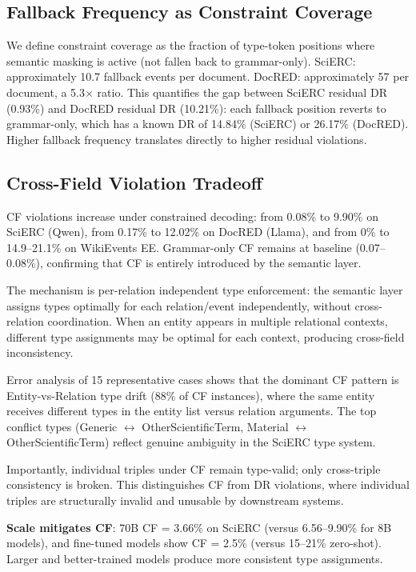 \documentclass[11pt,a4paper]{article}
\newcommand{\drsym}{\textsc{DR}}
\newcommand{\cfsym}{\textsc{CF}}
\begin{document}
\subsection{Fallback Frequency as Constraint Coverage}

We define constraint coverage as the fraction of type-token positions where semantic masking is active (not fallen back to grammar-only). SciERC: approximately 10.7 fallback events per document. DocRED: approximately 57 per document, a 5.3$\times$ ratio. This quantifies the gap between SciERC residual \drsym{} (0.93\%) and DocRED residual \drsym{} (10.21\%): each fallback position reverts to grammar-only, which has a known \drsym{} of 14.84\% (SciERC) or 26.17\% (DocRED). Higher fallback frequency translates directly to higher residual violations.

\subsection{Cross-Field Violation Tradeoff}
\label{sec:cf}

\cfsym{} violations increase under constrained decoding: from 0.08\% to 9.90\% on SciERC (Qwen), from 0.17\% to 12.02\% on DocRED (Llama), and from 0\% to 14.9--21.1\% on WikiEvents EE. Grammar-only \cfsym{} remains at baseline (0.07--0.08\%), confirming that \cfsym{} is entirely introduced by the semantic layer.

The mechanism is per-relation independent type enforcement: the semantic layer assigns types optimally for each relation/event independently, without cross-relation coordination. When an entity appears in multiple relational contexts, different type assignments may be optimal for each context, producing cross-field inconsistency.

Error analysis of 15 representative cases shows that the dominant \cfsym{} pattern is Entity-vs-Relation type drift (88\% of \cfsym{} instances), where the same entity receives different types in the entity list versus relation arguments. The top conflict types (Generic $\leftrightarrow$ OtherScientificTerm, Material $\leftrightarrow$ OtherScientificTerm) reflect genuine ambiguity in the SciERC type system.

Importantly, individual triples under \cfsym{} remain type-valid; only cross-triple consistency is broken. This distinguishes \cfsym{} from \drsym{} violations, where individual triples are structurally invalid and unusable by downstream systems.

\textbf{Scale mitigates \cfsym{}}: 70B \cfsym{} = 3.66\% on SciERC (versus 6.56--9.90\% for 8B models), and fine-tuned models show \cfsym{} = 2.5\% (versus 15--21\% zero-shot). Larger and better-trained models produce more consistent type assignments.
\end{document}
